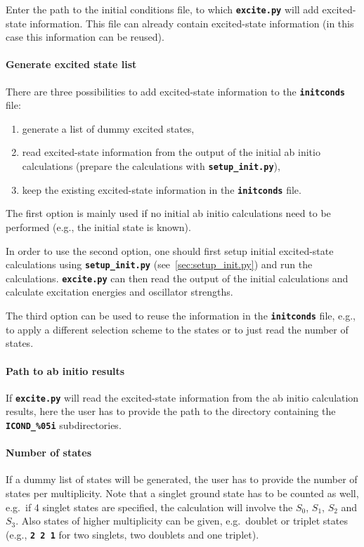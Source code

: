 \documentclass[a4paper,11pt,DIV=15,openany,twoside=false]{scrbook}
\newcommand{\ttt}[1]{\textbf{\texttt{#1}}}
\begin{document}
Enter the path to the initial conditions file, to which \ttt{excite.py} will add excited-state information. This file can already contain excited-state information (in this case this information can be reused).

\paragraph{Generate excited state list}

There are three possibilities to add excited-state information to the \ttt{initconds} file:
\begin{enumerate}
  \item generate a list of dummy excited states,
  \item read excited-state information from the output of the initial ab initio calculations (prepare the calculations with \ttt{setup\_init.py}),
  \item keep the existing excited-state information in the \ttt{initconds} file.
\end{enumerate}
The first option is mainly used if no initial ab initio calculations need to be performed (e.g., the initial state is known). 

In order to use the second option, one should first setup initial excited-state calculations using \ttt{setup\_init.py} (see~\ref{sec:setup_init.py}) and run the calculations. \ttt{excite.py} can then read the output of the initial calculations and calculate excitation energies and oscillator strengths.

The third option can be used to reuse the information in the \ttt{initconds} file, e.g., to apply a different selection scheme to the states or to just read the number of states.

\paragraph{Path to ab initio results}

If \ttt{excite.py} will read the excited-state information from the ab initio calculation results, here the user has to provide the path to the directory containing the \ttt{ICOND\_\%05i} subdirectories.

\paragraph{Number of states}

If a dummy list of states will be generated, the user has to provide the number of states per multiplicity. Note that a singlet ground state has to be counted as well, e.g.\ if 4 singlet states are specified, the calculation will involve the $S_0$, $S_1$, $S_2$ and $S_3$. Also states of higher multiplicity can be given, e.g.\ doublet or triplet states (e.g., \ttt{2 2 1} for two singlets, two doublets and one triplet).
\end{document}
